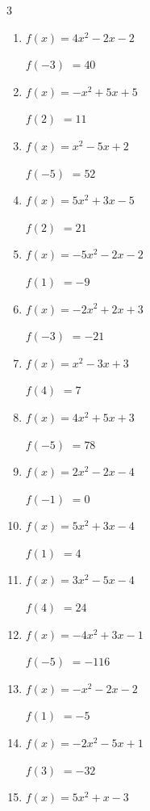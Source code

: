 \begin{multicols}{3}
\begin{enumerate}
$f(-3)$
        $= -47$

\columnbreak %

  \item $f(x)=4x^{2}-2x-2$

$f(-3)$
        $= 40$

  \item $f(x)=-x^{2}+5x+5$

$f(2)$
        $= 11$

  \item $f(x)=x^{2}-5x+2$

$f(-5)$
        $= 52$

  \item $f(x)=5x^{2}+3x-5$

$f(2)$
        $= 21$

  \item $f(x)=-5x^{2}-2x-2$

$f(1)$
        $= -9$

  \item $f(x)=-2x^{2}+2x+3$

$f(-3)$
        $= -21$

  \item $f(x)=x^{2}-3x+3$

$f(4)$
        $= 7$

  \item $f(x)=4x^{2}+5x+3$

$f(-5)$
        $= 78$

  \item $f(x)=2x^{2}-2x-4$

$f(-1)$
        $= 0$

  \item $f(x)=5x^{2}+3x-4$

$f(1)$
        $= 4$

  \item $f(x)=3x^{2}-5x-4$

$f(4)$
        $= 24$

  \item $f(x)=-4x^{2}+3x-1$

$f(-5)$
        $= -116$

  \item $f(x)=-x^{2}-2x-2$

$f(1)$
        $= -5$

  \item $f(x)=-2x^{2}-5x+1$

$f(3)$
        $= -32$

  \item $f(x)=5x^{2}+x-3$


\end{enumerate}
\end{multicols}
